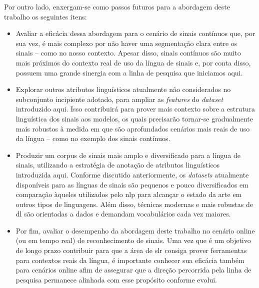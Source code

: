 Por outro lado, enxergam-se como passos futuros para a abordagem deste trabalho os seguintes itens:


\begin{itemize}
    \item Avaliar a eficácia dessa abordagem para o cenário de sinais contínuos que, por sua vez, é mais complexo por não haver uma segmentação clara entre os sinais -- como no nosso contexto.
          Apesar disso, sinais contínuos são muito mais próximos do contexto real de uso da língua de sinais e, por conta disso, possuem uma grande sinergia com a linha de pesquisa que iniciamos aqui.

    \item Explorar outros atributos linguísticos atualmente não considerados no subconjunto incipiente adotado, para ampliar as \textit{features} do \textit{dataset} introduzido aqui.
          Isso contribuirá para prover mais contexto sobre a estrutura linguística dos sinais aos modelos, os quais precisarão tornar-se gradualmente mais robustos à medida em que são aprofundados cenários mais reais de uso da língua -- como no exemplo dos sinais contínuos.

    \item Produzir um corpus de sinais mais amplo e diversificado para a língua de sinais, utilizando a estratégia de anotação de atributos linguísticos introduzida aqui.
          Conforme discutido anteriormente, os \textit{datasets} atualmente disponíveis para as línguas de sinais são pequenos e pouco diversificados em comparação àqueles utilizados pelo \acrfull{nlp} para alcançar o estado da arte em outros tipos de linguagens.
          Além disso, técnicas modernas e mais robustas de \acrlong{dl} são orientadas a dados e demandam vocabulários cada vez maiores.

    \item Por fim, avaliar o desempenho da abordagem deste trabalho no cenário online (ou em tempo real) de reconhecimento de sinais.
          Uma vez que é um objetivo de longo prazo contribuir para que a área de \acrshort{slr} consiga prover ferramentas para contextos reais da língua, é importante conhecer sua eficácia também para cenários online afim de assegurar que a direção percorrida pela linha de pesquisa permanece alinhada com esse propósito conforme evolui.
\end{itemize}



